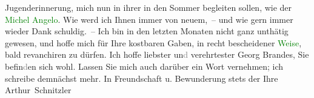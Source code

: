                Jugenderinnerung, mich nun in ihrer \label{K_L02413_1v}\label{K_L02413_1h} in den Sommer begleiten sollen, wie der \textcolor{green}{Michel Angelo}{}\ledrightnote{\textcolor{green}{Michelangelo Buonarotti}}. Wie werd ich Ihnen immer von neuem, – und wie gern
               immer wieder Dank schuldig. – Ich bin in den letzten Monaten nicht ganz unthätig
               gewesen, und hoffe mich für Ihre kostbaren {\pb}Gaben,
               in recht bescheidener \textcolor{green}{Weise}{}, bald revanchiren zu dürfen. Ich hoffe liebster un\textcolor{gray}{d}
               verehrtester Georg Brandes, Sie befin\textcolor{gray}{d}en sich wohl. Lassen Sie
               mich auch darüber ein Wort vernehmen; ich schreibe demnächst mehr. In Freundschaft u.
               Bewunderung stets der Ihre \spacefill\mbox{Arthur Schnitzler}\pend
           \endnumbering{}  
      